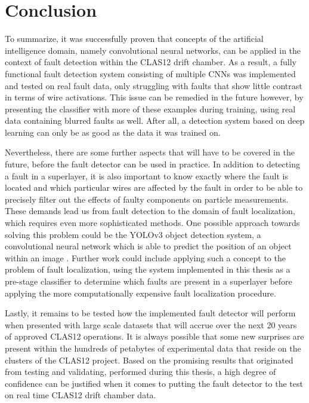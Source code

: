 \chapter{Conclusion}

To summarize, it was successfully proven that concepts of the
artificial intelligence domain, namely convolutional neural networks,
can be applied in the context of fault detection within the CLAS12
drift chamber. As a result, a fully functional fault detection system
consisting of multiple CNNs was implemented and tested on real fault
data, only struggling with faults that show little contrast in terms
of wire activations. This issue can be remedied in the future however,
by presenting the classifier with more of these examples
during training, using real data containing blurred faults as
well. After all, a detection system based on deep learning
can only be as good as the data it was trained on.

Nevertheless, there are some further aspects that will have to be
covered in the future, before the fault detector can be used in
practice. In addition to detecting a fault in a superlayer, it is also
important to know exactly where the fault is located and which
particular wires are affected by the fault in order to be able to
precisely filter out the effects of faulty components on particle
measurements. These demands lead us from fault detection to the
domain of fault localization, which requires even more sophisticated
methods. One possible approach towards solving this problem could be
the YOLOv3 object detection system, a convolutional neural network
which is able to predict the position of an object within an image
\cite{yolo}. Further work could include applying such a concept to the
problem of fault localization, using the system implemented in
this thesis as a pre-stage classifier to determine which faults are
present in a superlayer before applying the more computationally
expensive fault localization procedure.

Lastly, it remains to be tested how the implemented fault detector
will perform when presented with large scale datasets that will accrue over
the next 20 years of approved CLAS12 operations. It is always possible
that some new surprises are present within the hundreds of petabytes
of experimental data that reside on the clusters of the CLAS12
project. Based on the promising results that originated from testing
and validating, performed
during this thesis, a high degree of confidence can be
justified when it comes to putting the fault detector to the test on
real time CLAS12 drift chamber data.
